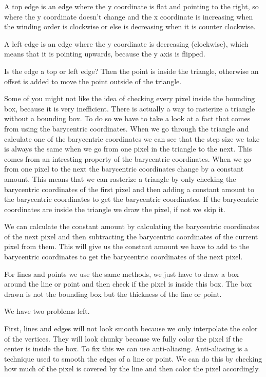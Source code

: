 \documentclass[12pt]{report} \usepackage{preamble}
\begin{document}
A top edge is an edge where the y coordinate is flat and pointing to the right, so where the y coordinate doesn't change
and the x coordinate is increasing when the winding order is clockwise or else is decreasing when it is counter clockwise.

A left edge is an edge where the y coordinate is decreasing (clockwise), which means that it is pointing upwards, because the y axis is flipped.

Is the edge a top or left edge? Then the point is inside the triangle, otherwise an offset is added to move the point outside of the triangle.

Some of you might not like the idea of checking every pixel inside the bounding box, because it is very inefficient. There is actually
a way to rasterize a triangle without a bounding box. To do so we have to take a look at a fact that comes from using the barycentric coordinates.
When we go through the triangle and calculate one of the barycentric coordinates we can see that the step size we take is always the same
when we go from one pixel in the triangle to the next. This comes from an intresting property of the barycentric coordinates. When we go from
one pixel to the next the barycentric coordinates change by a constant amount. This means that we can rasterize a triangle by only checking
the barycentric coordinates of the first pixel and then adding a constant amount to the barycentric coordinates to get the barycentric coordinates.
If the barycentric coordinates are inside the triangle we draw the pixel, if not we skip it.

We can calculate the constant amount by calculating the barycentric coordinates of the next pixel and then subtracting the barycentric coordinates
of the current pixel from them. This will give us the constant amount we have to add to the barycentric coordinates to get the barycentric coordinates
of the next pixel.

For lines and points we use the same methods, we just have to draw a box around the line or point and then check if the pixel is inside this box.
The box drawn is not the bounding box but the thickness of the line or point.

We have two problems left.

First, lines and edges will not look smooth because we only interpolate the color of the vertices. They will look chunky
because we fully color the pixel if the center is inside the box. To fix this we can use anti-aliasing. Anti-aliasing is a technique used to
smooth the edges of a line or point. We can do this by checking how much of the pixel is covered by the line and then color the pixel
accordingly.
\end{document}
